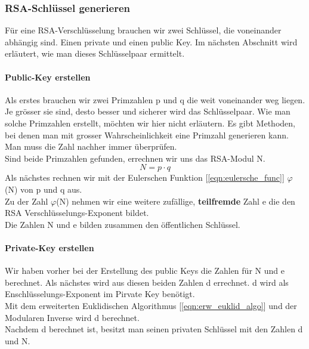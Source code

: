 \subsubsection{RSA-Schlüssel generieren}
Für eine RSA-Verschlüsselung brauchen wir zwei Schlüssel, die voneinander abhängig sind. Einen private und einen public Key. Im nächsten Abschnitt wird erläutert, wie man dieses Schlüsselpaar ermittelt.%
%
\paragraph{Public-Key erstellen}\label{sec:public_key}
Als erstes brauchen wir zwei Primzahlen p und q die weit voneinander weg liegen. Je grösser sie sind, desto besser und sicherer wird das Schlüsselpaar. Wie man solche Primzahlen erstellt, möchten wir hier nicht erläutern. Es gibt Methoden, bei denen man mit grosser Wahrscheinlichkeit eine Primzahl generieren kann. Man muss die Zahl nachher immer überprüfen.\\
Sind beide Primzahlen gefunden, errechnen wir uns das RSA-Modul N. %
%
\begin{equation}
  N = p \cdot q
  \label{eqn:rsa_modul}
\end{equation}
%
Als nächstes rechnen wir mit der Eulerschen Funktion [\ref{eqn:eulersche_func}] $\varphi$(N) von p und q aus.\\
Zu der Zahl $\varphi$(N) nehmen wir eine weitere zufällige, \textbf{teilfremde} Zahl e die den RSA Verschlüsselungs-Exponent bildet.\\
Die Zahlen N und e bilden zusammen den öffentlichen Schlüssel.
\paragraph{Private-Key erstellen}
Wir haben vorher bei der Erstellung des public Keys die Zahlen für N und e berechnet. Als nächstes wird aus diesen beiden Zahlen d errechnet. d wird als Enschlüsselungs-Exponent im Pirvate Key benötigt.\\
Mit dem erweiterten Euklidischen Algorithmus [\ref{eqn:erw_euklid_algo}] und der Modularen Inverse wird d berechnet.\\
%
%
Nachdem d berechnet ist, besitzt man seinen privaten Schlüssel mit den Zahlen d und N.
